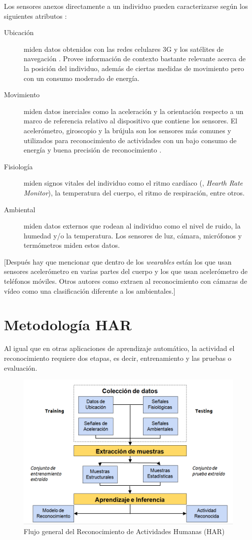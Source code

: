 Los sensores anexos directamente a un individuo pueden caracterizarse
según los siguientes atributos \cite{LaraLabrador2013}:
\begin{description}
\item [{Ubicación}] miden datos obtenidos con las redes celulares 3G y
los satélites de navegación . Provee información de contexto
bastante relevante acerca de la posición del individuo, además de
ciertas medidas de movimiento pero con un consumo moderado de energía.
\item [{Movimiento}] miden datos inerciales como la aceleración y la orientación
respecto a un marco de referencia relativo al dispositivo que contiene
los sensores. El acelerómetro, giroscopio y la brújula son los sensores
más comunes y utilizados para reconocimiento de actividades con un
bajo consumo de energía y buena precisión de reconocimiento \cite{Bao2004,LaraLabrador2012}.
\item [{Fisiología}] miden signos vitales del individuo como el ritmo cardíaco
(, \emph{Hearth Rate Monitor}), la temperatura del cuerpo,
el ritmo de respiración, entre otros.
\item [{Ambiental}] miden datos externos que rodean al individuo como el
nivel de ruido, la humedad y/o la temperatura. Los sensores de luz,
cámara, micrófonos y termómetros miden estos datos. 
\end{description}
{[}Después hay que mencionar que dentro de los \emph{wearables} están
los que usan sensores acelerómetro en varias partes del cuerpo y los
que usan acelerómetro de teléfonos móviles. Otros autores como \cite{karmul2010}
extraen al reconocimiento con cámaras de vídeo como una clasificación
diferente a los ambientales.{]}

\section{Metodología HAR}

\label{sec25:metodologia-har} Al igual que en otras aplicaciones
de aprendizaje automático, la actividad el reconocimiento requiere
dos etapas, es decir, entrenamiento y las pruebas o evaluación.

\begin{figure}[!htbp]
\centering \includegraphics[width=0.7\linewidth]{capitulo-2/graphics/harsystem}
\caption[Flujo HAR]{Flujo general del Reconocimiento de Actividades Humanas (HAR)}
\label{fig:harsystem} 
\end{figure}

